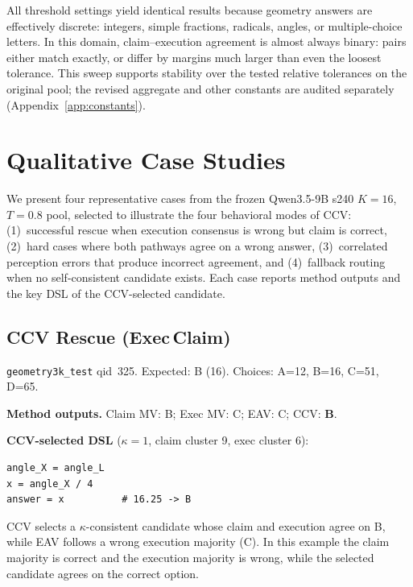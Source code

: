 \documentclass{article}
\newcommand{\ccv}{\textsc{CCV}}
\begin{document}
All threshold settings yield identical results because geometry answers are effectively discrete: integers, simple fractions, radicals, angles, or multiple-choice letters. In this domain, claim--execution agreement is almost always binary: pairs either match exactly, or differ by margins much larger than even the loosest tolerance. This sweep supports stability over the tested relative tolerances on the original pool; the revised aggregate and other constants are audited separately (Appendix~\ref{app:constants}).

\section{Qualitative Case Studies}
\label{app:case-studies}

We present four representative cases from the frozen Qwen3.5-9B s240 $K{=}16$, $T{=}0.8$ pool, selected to illustrate the four behavioral modes of \ccv{}: (1)~successful rescue when execution consensus is wrong but claim is correct, (2)~hard cases where both pathways agree on a wrong answer, (3)~correlated perception errors that produce incorrect agreement, and (4)~fallback routing when no self-consistent candidate exists. Each case reports method outputs and the key DSL of the \ccv{}-selected candidate.

\subsection{CCV Rescue (Exec\,Claim)}

\texttt{geometry3k\_test} qid~325. Expected: B (16). Choices: A=12, B=16, C=51, D=65.

\smallskip
\noindent \textbf{Method outputs.} Claim MV: B; Exec MV: C; EAV: C; \ccv{}: \textbf{B}.
\smallskip

\begin{minipage}{\linewidth}
\noindent \textbf{CCV-selected DSL} ($\kappa=1$, claim cluster 9, exec cluster 6):
\begin{verbatim}
angle_X = angle_L
x = angle_X / 4
answer = x          # 16.25 -> B
\end{verbatim}
\end{minipage}

\ccv{} selects a $\kappa$-consistent candidate whose claim and execution agree on B, while EAV follows a wrong execution majority (C). In this example the claim majority is correct and the execution majority is wrong, while the selected candidate agrees on the correct option.
\end{document}
